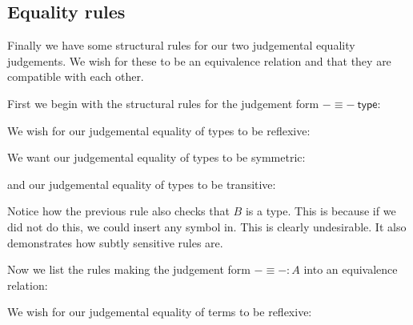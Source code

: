 \subsection{Equality rules}
Finally we have some structural rules for our two judgemental equality judgements. We wish for these to be an equivalence relation and that they are compatible with each other.

First we begin with the structural rules for the judgement form $- \equiv -\ \mathsf{type}$:

\begin{defin}

    We wish for our judgemental equality of types to be reflexive:
    \begin{prooftree}
    \end{prooftree}

    We want our judgemental equality of types to be symmetric:
    \begin{prooftree}
    \end{prooftree}

    and our judgemental equality of types to be transitive:

    \begin{prooftree}
    \end{prooftree}

    Notice how the previous rule also checks that $B$ is a type. This is because if we did not do this, we could insert any symbol in. This is clearly undesirable. It also demonstrates how subtly sensitive rules are.

    Now we list the rules making the judgement form $- \equiv - : A$ into an equivalence relation:

    We wish for our judgemental equality of terms to be reflexive:
    \begin{prooftree}
    \end{prooftree}


\end{defin}
